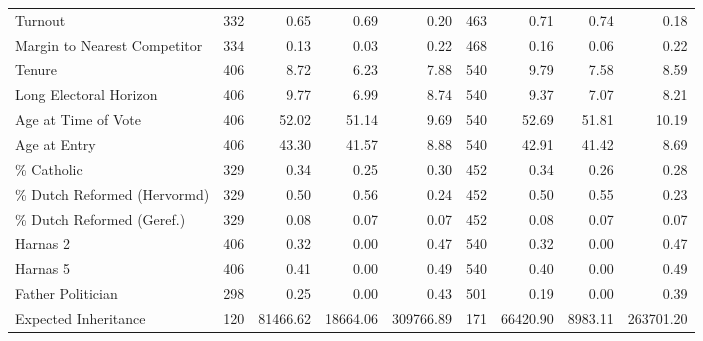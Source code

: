 \begin{table}
\begin{tabular}[t]{lrrrrrrrr}
Turnout & 332 & \num{0.65} & \num{0.69} & \num{0.20} & 463 & \num{0.71} & \num{0.74} & \num{0.18}\\
Margin to Nearest Competitor & 334 & \num{0.13} & \num{0.03} & \num{0.22} & 468 & \num{0.16} & \num{0.06} & \num{0.22}\\
Tenure & 406 & \num{8.72} & \num{6.23} & \num{7.88} & 540 & \num{9.79} & \num{7.58} & \num{8.59}\\
Long Electoral Horizon & 406 & \num{9.77} & \num{6.99} & \num{8.74} & 540 & \num{9.37} & \num{7.07} & \num{8.21}\\
Age at Time of Vote & 406 & \num{52.02} & \num{51.14} & \num{9.69} & 540 & \num{52.69} & \num{51.81} & \num{10.19}\\
Age at Entry & 406 & \num{43.30} & \num{41.57} & \num{8.88} & 540 & \num{42.91} & \num{41.42} & \num{8.69}\\
\% Catholic & 329 & \num{0.34} & \num{0.25} & \num{0.30} & 452 & \num{0.34} & \num{0.26} & \num{0.28}\\
\% Dutch Reformed (Hervormd) & 329 & \num{0.50} & \num{0.56} & \num{0.24} & 452 & \num{0.50} & \num{0.55} & \num{0.23}\\
\% Dutch Reformed (Geref.) & 329 & \num{0.08} & \num{0.07} & \num{0.07} & 452 & \num{0.08} & \num{0.07} & \num{0.07}\\
Harnas 2 & 406 & \num{0.32} & \num{0.00} & \num{0.47} & 540 & \num{0.32} & \num{0.00} & \num{0.47}\\
Harnas 5 & 406 & \num{0.41} & \num{0.00} & \num{0.49} & 540 & \num{0.40} & \num{0.00} & \num{0.49}\\
Father Politician & 298 & \num{0.25} & \num{0.00} & \num{0.43} & 501 & \num{0.19} & \num{0.00} & \num{0.39}\\
Expected Inheritance & 120 & \num{81466.62} & \num{18664.06} & \num{309766.89} & 171 & \num{66420.90} & \num{8983.11} & \num{263701.20}\\
\bottomrule
\end{tabular}
\end{table}
